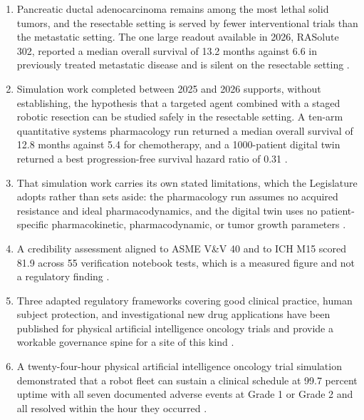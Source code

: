 \begin{enumerate}
\item Pancreatic ductal adenocarcinoma remains among the most lethal solid
  tumors, and the resectable setting is served by fewer interventional trials
  than the metastatic setting. The one large readout available in 2026,
  RASolute 302, reported a median overall survival of 13.2 months against 6.6 in
  previously treated metastatic disease and is silent on the resectable setting
  \cite{rasolute302}.

\item Simulation work completed between 2025 and 2026 supports, without
  establishing, the hypothesis that a targeted agent combined with a staged
  robotic resection can be studied safely in the resectable setting. A ten-arm
  quantitative systems pharmacology run returned a median overall survival of
  12.8 months against 5.4 for chemotherapy, and a 1000-patient digital twin
  returned a best progression-free survival hazard ratio of 0.31
  \cite{qspmetpancre,daraxsims}.

\item That simulation work carries its own stated limitations, which the
  Legislature adopts rather than sets aside: the pharmacology run assumes no
  acquired resistance and ideal pharmacodynamics, and the digital twin uses no
  patient-specific pharmacokinetic, pharmacodynamic, or tumor growth parameters
  \cite{qspmetpancre,daraxsims}.

\item A credibility assessment aligned to ASME V\&V 40 and to ICH M15 scored
  81.9 across 55 verification notebook tests, which is a measured figure and not
  a regulatory finding \cite{daraxsims,asmevv40,ichm15}.

\item Three adapted regulatory frameworks covering good clinical practice, human
  subject protection, and investigational new drug applications have been
  published for physical artificial intelligence oncology trials and provide a
  workable governance spine for a site of this kind
  \cite{iche6r3adapt,cfr50adapt,cfr312adapt}.

\item A twenty-four-hour physical artificial intelligence oncology trial
  simulation demonstrated that a robot fleet can sustain a clinical schedule at
  99.7 percent uptime with all seven documented adverse events at Grade 1 or
  Grade 2 and all resolved within the hour they occurred \cite{newtrial2026}.


\end{enumerate}
